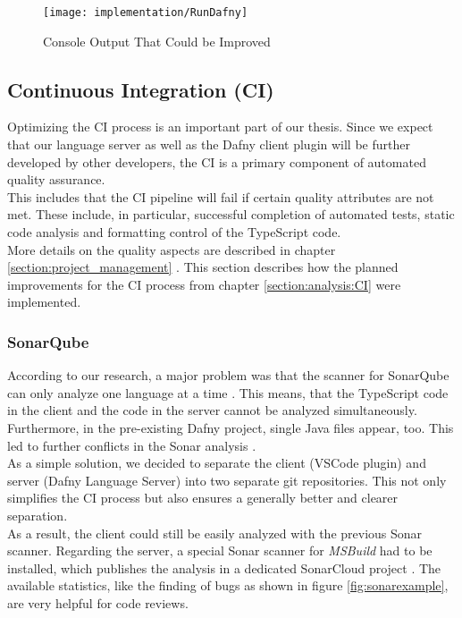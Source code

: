 \begin{figure}[H]
    \centering
    \texttt{[image: implementation/RunDafny]}
    \caption{Console Output That Could be Improved}
    \label{fig:long_compile_output}
\end{figure}

\subsection{Continuous Integration (CI)}
Optimizing the CI process is an important part of our thesis.
Since we expect that our language server as well as the Dafny client plugin will be further developed by other developers,
the CI is a primary component of automated quality assurance. \\

This includes that the CI pipeline will fail if certain quality attributes are not met.
These include, in particular, successful completion of automated tests,
static code analysis and formatting control of the TypeScript code. \\

More details on the quality aspects are described in chapter
\ref{section:project_management} \textendash{} .
This section describes how the planned improvements for the CI process from chapter \ref{section:analysis:CI} were implemented.

\subsubsection{SonarQube}
According to our research, a major problem was that the scanner for SonarQube can only analyze one language at a time \cite{sonar-supports-only-one-language}.
This means, that the TypeScript code in the client and the \CsharpWithSpace code in the server cannot be analyzed simultaneously.
Furthermore, in the pre-existing Dafny project, single Java files appear, too.
This led to further conflicts in the Sonar analysis \cite{sa}.\\

As a simple solution, we decided to separate the client (VSCode plugin) and server (Dafny Language Server) into two separate git repositories.
This not only simplifies the CI process but also ensures a generally better and clearer separation. \\

As a result, the client could still be easily analyzed with the previous Sonar scanner.
Regarding the server, a special Sonar scanner for \textit{MSBuild} had to be installed, which publishes the analysis in a dedicated SonarCloud project \cite{dev}.
The available statistics, like the finding of bugs as shown in figure \ref{fig:sonarexample}, are very helpful for code reviews.\\

